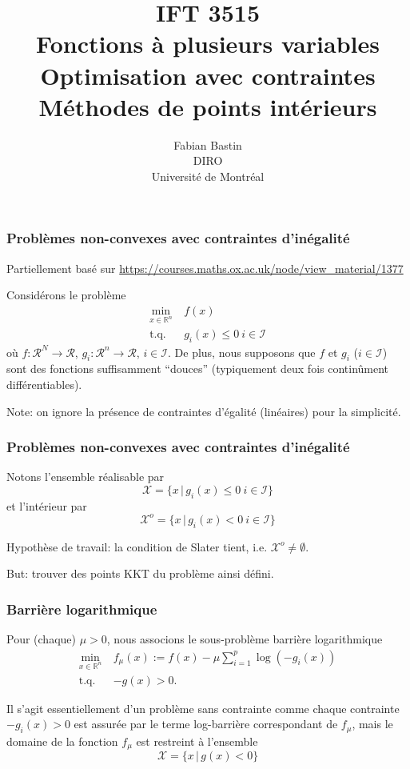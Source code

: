 \documentclass[usepdftitle=false]{beamer}
\title[IFT3515]{IFT 3515\\Fonctions à plusieurs variables\\Optimisation avec contraintes\\Méthodes de points intérieurs}
\author[Fabian Bastin]{Fabian Bastin\\DIRO\\Université de Montréal}
\date{}
\def\blue{\color{blue}}
\def\cI{\mathcal{I}}
\def\cR{\mathcal{R}}
\def\cX{\mathcal{X}}
\def\RR{\mathbb{R}}
\begin{document}
\frame{\titlepage}

\begin{frame}
\frametitle{Problèmes non-convexes avec contraintes d'inégalité}

Partiellement basé sur \url{https://courses.maths.ox.ac.uk/node/view_material/1377}

\mbox{}

Considérons le problème
\begin{align*}
\min_{x \in \RR^n}\ & f(x) \\
\mbox{t.q. } & g_i(x) \leq 0\ i \in \cI
\end{align*}
où $f: \cR^N \rightarrow \cR$, $g_i: \cR^n \rightarrow \cR$, $i \in \cI$. De plus, nous supposons que $f$ et $g_i$ ($i \in \cI$) sont des fonctions suffisamment ``douces'' (typiquement deux fois continûment différentiables).

\mbox{}

Note: on ignore la présence de contraintes d'égalité (linéaires) pour la simplicité.

\end{frame}

\begin{frame}
\frametitle{Problèmes non-convexes avec contraintes d'inégalité}

Notons l'ensemble réalisable par
$$
\cX = \{ x \,|\, g_i(x) \leq 0\ i \in \cI \}
$$
et l'intérieur par
$$
\cX^o = \{ x \,|\, g_i(x) < 0\ i \in \cI \}
$$

\mbox{}

{\blue Hypothèse de travail}: la condition de Slater tient, i.e. $\cX^o \ne \emptyset$.

\mbox{}

But: trouver des points KKT du problème ainsi défini.

\end{frame}

\begin{frame}
\frametitle{Barrière logarithmique}

Pour (chaque) $\mu > 0$, nous associons le sous-problème barrière logarithmique
\begin{align*}
\min_{x \in \RR^n}\ & f_\mu(x) := f(x) - \mu \sum_{i = 1}^p \log (-g_i(x)) \\
\mbox{t.q. } & -g(x) > 0.
\end{align*}

Il s'agit essentiellement d'un problème sans contrainte comme chaque contrainte $-g_i(x) > 0$ est assurée  par le terme log-barrière correspondant de $f_\mu$, mais le domaine de la fonction $f_{\mu}$ est restreint à l'ensemble
$$
\cX = \{ x \,|\, g(x) < 0 \}
$$

\end{frame}
\end{document}
